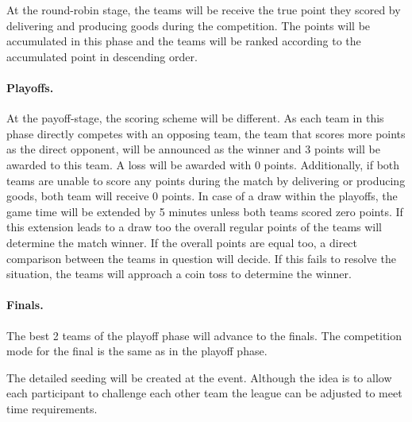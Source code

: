 \documentclass[12pt,twoside]{article}
\begin{document}
At the round-robin stage, the teams will be receive the true point
they scored by delivering and producing goods during the
competition. The points will be accumulated in this phase and the
teams will be ranked according to the accumulated point in descending
order.

\paragraph{Playoffs.~ } At the payoff-stage, the scoring scheme will be different. As each
team in this phase directly competes with an opposing team, the team
that scores more points as the direct opponent, will be announced as
the winner and 3 points will be awarded to this team. A loss will be
awarded with 0 points. Additionally, if both teams are unable to score
any points during the match by delivering or producing goods, both
team will receive 0 points.
%
%
In case of a draw within the playoffs, the game time will be extended
by 5 minutes unless both teams scored zero points.
%
If this extension leads to a draw too the overall regular points of
the teams will determine the match winner. If the overall points are
equal too, a direct comparison between the teams in question will
decide. If this fails to resolve the situation, the teams will
approach a coin toss to determine the winner.

\paragraph{Finals.~} The best 2 teams of the playoff phase will
advance to the finals. The competition mode for the final is the same
as in the playoff phase.

The detailed seeding will be created at the event. Although the idea
is to allow each participant to challenge each other team the league
can be adjusted to meet time requirements.
\end{document}
